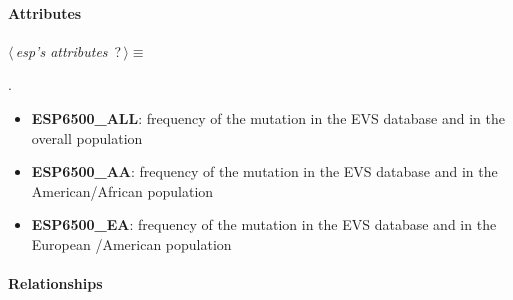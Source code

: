 \newpage

\paragraph{Attributes}      

	\begin{flushleft} \small
\begin{minipage}{\linewidth}\label{scrap12}\raggedright\small
{} $\langle\,${\itshape {esp's attributes}}\nobreak\ {\footnotesize {?}}$\,\rangle\equiv$
\vspace{-1ex}
\begin{list}{}{} \item

                
        {\NWsep}
\end{list}
\vspace{-1.5ex}
\footnotesize
\begin{list}{}{\setlength{\itemsep}{-\parsep}\setlength{\itemindent}{-\leftmargin}}
\item {\NWtxtMacroNoRef}.

\item{}
\end{list}
\end{minipage}\vspace{4ex}
\end{flushleft}
\begin{itemize}
 	\item \textbf{ESP6500\_ALL}: frequency of the mutation in the EVS database and in the overall population
 	\item \textbf{ESP6500\_AA}: frequency of the mutation in the EVS database and in the American/African population
 	\item \textbf{ESP6500\_EA}: frequency of the mutation in the EVS database and in the European /American population
\end{itemize}

\newpage

\paragraph{Relationships} 

